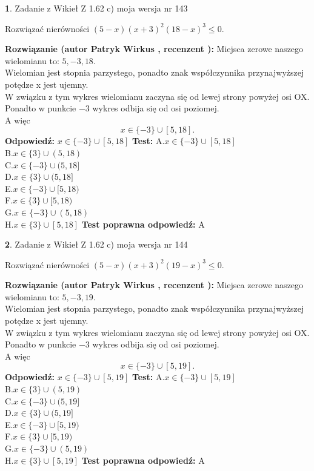 \documentclass[12pt, a4paper]{article}
\theoremstyle{definition} %
\newtheorem{zad}{}
\newcommand{\zadStart}[1]{\begin{zad}#1\newline}
\newcommand{\zadStop}{\end{zad}}
\newcommand{\rozwStart}[2]{\noindent \textbf{Rozwiązanie (autor #1 , recenzent #2): }\newline}
\newcommand{\rozwStop}{\newline}
\newcommand{\odpStart}{\noindent \textbf{Odpowiedź:}\newline}
\newcommand{\odpStop}{\newline}
\newcommand{\testStart}{\noindent \textbf{Test:}\newline}
\newcommand{\testStop}{\newline}
\newcommand{\kluczStart}{\noindent \textbf{Test poprawna odpowiedź:}\newline}
\newcommand{\kluczStop}{\newline}
\begin{document}
\zadStart{Zadanie z Wikieł Z 1.62 c) moja wersja nr 143}

Rozwiązać nierówności $(5-x)(x+3)^{2}(18-x)^{3}\le0$.
\zadStop
\rozwStart{Patryk Wirkus}{}
Miejsca zerowe naszego wielomianu to: $5, -3, 18$.\\
Wielomian jest stopnia parzystego, ponadto znak współczynnika przy\linebreak najwyższej potędze x jest ujemny.\\ W związku z tym wykres wielomianu zaczyna się od lewej strony powyżej osi OX.\\
Ponadto w punkcie $-3$ wykres odbija się od osi poziomej.\\
A więc $$x \in \{-3\} \cup [5,18].$$
\rozwStop
\odpStart
$x \in \{-3\} \cup [5,18]$
\odpStop
\testStart
A.$x \in \{-3\} \cup [5,18]$\\
B.$x \in \{3\} \cup (5,18)$\\
C.$x \in \{-3\} \cup (5,18]$\\
D.$x \in \{3\} \cup (5,18]$\\
E.$x \in \{-3\} \cup [5,18)$\\
F.$x \in \{3\} \cup [5,18)$\\
G.$x \in \{-3\} \cup (5,18)$\\
H.$x \in \{3\} \cup [5,18]$
\testStop
\kluczStart
A
\kluczStop



\zadStart{Zadanie z Wikieł Z 1.62 c) moja wersja nr 144}

Rozwiązać nierówności $(5-x)(x+3)^{2}(19-x)^{3}\le0$.
\zadStop
\rozwStart{Patryk Wirkus}{}
Miejsca zerowe naszego wielomianu to: $5, -3, 19$.\\
Wielomian jest stopnia parzystego, ponadto znak współczynnika przy\linebreak najwyższej potędze x jest ujemny.\\ W związku z tym wykres wielomianu zaczyna się od lewej strony powyżej osi OX.\\
Ponadto w punkcie $-3$ wykres odbija się od osi poziomej.\\
A więc $$x \in \{-3\} \cup [5,19].$$
\rozwStop
\odpStart
$x \in \{-3\} \cup [5,19]$
\odpStop
\testStart
A.$x \in \{-3\} \cup [5,19]$\\
B.$x \in \{3\} \cup (5,19)$\\
C.$x \in \{-3\} \cup (5,19]$\\
D.$x \in \{3\} \cup (5,19]$\\
E.$x \in \{-3\} \cup [5,19)$\\
F.$x \in \{3\} \cup [5,19)$\\
G.$x \in \{-3\} \cup (5,19)$\\
H.$x \in \{3\} \cup [5,19]$
\testStop
\kluczStart
A
\kluczStop
\end{document}

